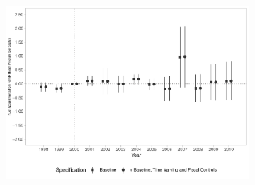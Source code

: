 \begin{figure}[h!]
\begin{center}
\begin{subfigure}{0.32\textwidth}
        \includegraphics[width=\textwidth]{plots/siab_cons_especif_psf_pcapita_dist_ec29_baseline_dist_ec29_baseline_12.pdf}
    \end{subfigure}
    
    \end{center}
    
\end{figure}